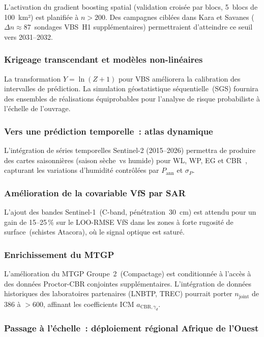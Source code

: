 \documentclass[10pt,a4paper,twocolumn]{article}
\begin{document}
	L'activation du gradient boosting spatial (validation croisée
	par blocs, 5~blocs de 100~km²) est planifiée à $n>200$.
	Des campagnes ciblées dans Kara et Savanes
	($\Delta n\approx87$~sondages VBS~H1 supplémentaires)
	permettraient d'atteindre ce seuil vers 2031--2032.
	
	\subsubsection{Krigeage transcendant et modèles non-linéaires}
	
	La transformation $Y=\ln(Z+1)$ pour VBS améliorera la
	calibration des intervalles de prédiction.
	La simulation géostatistique séquentielle~(SGS) fournira des
	ensembles de réalisations équiprobables pour l'analyse de risque
	probabiliste à l'échelle de l'ouvrage.
	
	\subsubsection{Vers une prédiction temporelle~: atlas dynamique}
	
	L'intégration de séries temporelles Sentinel-2 (2015--2026)
	permettra de produire des cartes saisonnières (saison sèche~vs
	humide) pour WL, WP, EG et CBR~\cite{gundogdu2007spatial},
	capturant les variations d'humidité contrôlées par
	$P_{\mathrm{ann}}$ et $\sigma_P$.
	
	\subsubsection{Amélioration de la covariable VfS par SAR}
	
	L'ajout des bandes Sentinel-1~(C-band, pénétration~30~cm) est
	attendu pour un gain de 15--25\,\% sur le LOO-RMSE VfS dans les
	zones à forte rugosité de surface~(schistes Atacora), où le signal
	optique est saturé.
	
	\subsubsection{Enrichissement du MTGP}
	
	L'amélioration du MTGP Groupe~2~(Compactage) est conditionnée à
	l'accès à des données Proctor-CBR conjointes supplémentaires.
	L'intégration de données historiques des laboratoires partenaires
	(LNBTP, TREC) pourrait porter $n_{\mathrm{joint}}$ de 386 à
	$>600$, affinant les coefficients ICM $a_{\mathrm{CBR},\gamma_d}$.
	
	\subsubsection{Passage à l'échelle~: déploiement régional Afrique de l'Ouest}
	
\end{document}
